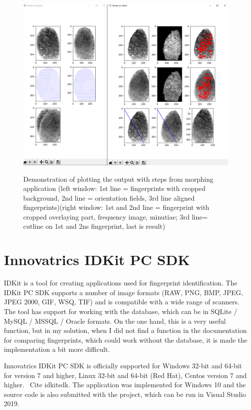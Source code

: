 \begin{figure}[H]
    \centering
        {\includegraphics[width=1\linewidth]{obrazky-figures/app_plot.png}}\\
        \caption{Demonstration of plotting the output with steps from morphing application (left window: 1st line = fingerprints with cropped background, 2nd line = orientation fields, 3rd line aligned fingerprints)(right window: 1st and 2nd line = fingerprint with cropped overlaying part, frequency image, minutiae; 3rd line= cutline on 1st and 2ns fingerprint, last is result)}
        \label{fig:app_plot}
\end{figure}

\section{Innovatrics IDKit PC SDK}
IDKit is a tool for creating applications used for fingerprint identification. The IDKit PC SDK supports a number of image formats (RAW, PNG, BMP, JPEG, JPEG 2000, GIF, WSQ, TIF) and is compatible with a wide range of scanners. The tool has support for working with the database, which can be in SQLite / MySQL / MSSQL / Oracle formats. \cite{idkitsdk} On the one hand, this is a very useful function, but in my solution, when I did not find a function in the documentation for comparing fingerprints, which could work without the database, it is made the implementation a bit more difficult.

Innovatrics IDKit PC SDK is officially supported for Windows 32-bit and 64-bit for version 7 and higher, Linux 32-bit and 64-bit (Red Hat), Centos version 7 and higher. \ Cite {idkitsdk}. The application was implemented for Windows 10 and the source code is also submitted with the project, which can be run in Visual Studio 2019.


